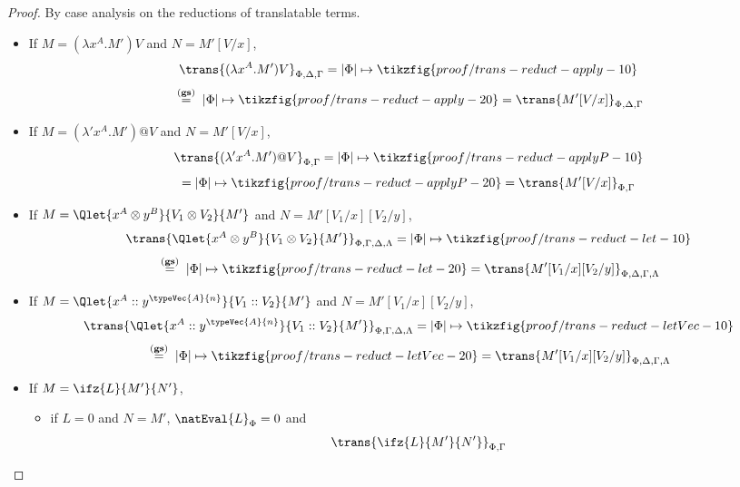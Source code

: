 \begin{proof}
    By case analysis on the reductions of translatable terms.
    \begin{itemize}
        \item If $M = (\lambda x^A.M')V$ and $N=M'[V/x]$,
            \[
                \trans{(\lambda x^A.M')V}_{\Phi,\Delta,\Gamma}
                =
                |\Phi|\mapsto\tikzfig{proof/trans-reduct-apply-10}
            \]
            \[
                \;\overset{\scriptstyle{\bf{(gs)}}}{=}\;
                |\Phi|\mapsto\tikzfig{proof/trans-reduct-apply-20}
                =
                \trans{M'[V/x]}_{\Phi,\Delta,\Gamma}
            \]
        \item If $M = (\lambda' x^A.M')@V$ and $N=M'[V/x]$,
            \[
                \trans{(\lambda' x^A.M')@V}_{\Phi,\Gamma}
                =
                |\Phi|\mapsto\tikzfig{proof/trans-reduct-applyP-10}
            \]
            \[
                =
                |\Phi|\mapsto\tikzfig{proof/trans-reduct-applyP-20}
                =
                \trans{M'[V/x]}_{\Phi,\Gamma}
            \]
        \item If $M = \Qlet{x^A\otimes y^B}{V_1 \otimes V_2}{M'}$ and $N=M'[V_1/x][V_2/y]$,
            \[
                \trans{\Qlet{x^A\otimes y^B}{V_1 \otimes V_2}{M'}}_{\Phi,\Gamma,\Delta,\Lambda}
                =
                |\Phi|\mapsto\tikzfig{proof/trans-reduct-let-10}
            \]
            \[
                \;\overset{\scriptstyle{\bf{(gs)}}}{=}\;
                |\Phi|\mapsto\tikzfig{proof/trans-reduct-let-20}
                =
                \trans{M'[V_1/x][V_2/y]}_{\Phi,\Delta,\Gamma,\Lambda}
            \]
        \item If $M = \Qlet{x^A :: y^{\typeVec{A}{n}}}{V_1 :: V_2}{M'}$ and $N=M'[V_1/x][V_2/y]$,
            \[
                \trans{\Qlet{x^A :: y^{\typeVec{A}{n}}}{V_1 :: V_2}{M'}}_{\Phi,\Gamma,\Delta,\Lambda}
                =
                |\Phi|\mapsto\tikzfig{proof/trans-reduct-letVec-10}
            \]
            \[
                \;\overset{\scriptstyle{\bf{(gs)}}}{=}\;
                |\Phi|\mapsto\tikzfig{proof/trans-reduct-letVec-20}
                =
                \trans{M'[V_1/x][V_2/y]}_{\Phi,\Delta,\Gamma,\Lambda}
            \]
        \item If $M = \ifz{L}{M'}{N'}$,
            \begin{itemize}
                \item if $L=0$ and $N = M'$, $\natEval{L}_\Phi = 0$ and
                    \[
                        \trans{\ifz{L}{M'}{N'}}_{\Phi,\Gamma}
\]
\end{itemize}
\end{itemize}
\end{proof}
